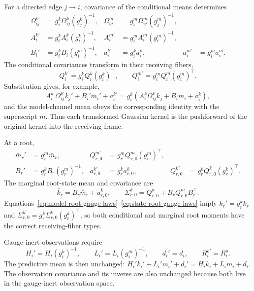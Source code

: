 For a directed edge \(j\to i\), covariance of the conditional means determines
\begin{align}
\Omega_{ij}^{k\prime}
&=g_i^k\Omega_{ij}^k(g_j^k)^{-1},
&
\Omega_{ij}^{m\prime}
&=g_i^m\Omega_{ij}^m(g_j^m)^{-1},
\label{eq:generative-link-gauge-laws}\\
A_i^{k\prime}
&=g_i^kA_i^k(g_i^k)^{-1},
&
A_i^{m\prime}
&=g_i^mA_i^m(g_i^m)^{-1},
\label{eq:generative-self-map-gauge-laws}\\
B_i'
&=g_i^kB_i(g_i^m)^{-1},
&
a_i^{k\prime}
&=g_i^k a_i^k,
&
a_i^{m\prime}
&=g_i^m a_i^m.
\label{eq:generative-bridge-offset-gauge-laws}
\end{align}
The conditional covariances transform in their receiving fibers,
\begin{equation}
Q_i^{k\prime}=g_i^kQ_i^k(g_i^k)^\top,
\qquad
Q_i^{m\prime}=g_i^mQ_i^m(g_i^m)^\top.
\label{eq:generative-covariance-gauge-laws}
\end{equation}
Substitution gives, for example,
\begin{equation}
A_i^{k\prime}\Omega_{ij}^{k\prime}k_j'
+B_i'm_i'+a_i^{k\prime}
=g_i^k\left(A_i^k\Omega_{ij}^k k_j+B_i m_i+a_i^k\right),
\label{eq:state-mean-gauge-covariance}
\end{equation}
and the model-channel mean obeys the corresponding identity with the superscript \(m\). Thus each transformed Gaussian kernel is the pushforward of the original kernel into the receiving frame.

At a root,
\begin{align}
\bar m_r'&=g_r^m\bar m_r,
&
Q_{r,0}^{m\prime}&=g_r^mQ_{r,0}^m(g_r^m)^\top,
\label{eq:model-root-gauge-laws}\\
B_r'&=g_r^kB_r(g_r^m)^{-1},
&
a_{r,0}^{k\prime}&=g_r^k a_{r,0}^k,
&
Q_{r,0}^{k\prime}&=g_r^kQ_{r,0}^k(g_r^k)^\top.
\label{eq:state-root-gauge-laws}
\end{align}
The marginal root-state mean and covariance are
\begin{equation}
\bar k_r=B_r\bar m_r+a_{r,0}^k,
\qquad
\Sigma_{r,0}^k=Q_{r,0}^k+B_rQ_{r,0}^mB_r^\top.
\label{eq:root-state-marginal-moments}
\end{equation}
Equations~\eqref{eq:model-root-gauge-laws}--\eqref{eq:state-root-gauge-laws} imply \(\bar k_r'=g_r^k\bar k_r\) and \(\Sigma_{r,0}^{k\prime}=g_r^k\Sigma_{r,0}^k(g_r^k)^\top\), so both conditional and marginal root moments have the correct receiving-fiber types.

Gauge-inert observations require
\begin{equation}
H_i'=H_i(g_i^k)^{-1},
\qquad
L_i'=L_i(g_i^m)^{-1},
\qquad
d_i'=d_i,
\qquad
R_i^{o\prime}=R_i^o.
\label{eq:observation-parameter-gauge-laws}
\end{equation}
The predictive mean is then unchanged: \(H_i'k_i'+L_i'm_i'+d_i'=H_i k_i+L_i m_i+d_i\). The observation covariance and its inverse are also unchanged because both live in the gauge-inert observation space.


